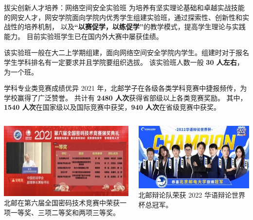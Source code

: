 \documentclass[aspectratio=169, utf8]{beamer}
\begin{document}
\begin{frame}{拔尖创新人才培养：网络空间安全实验班}
    为培养有坚实理论基础和卓越实战技能的网安人才，网安学院面向学院内优秀学生组建实验班，通过探索性、创新性和实战性的培养机制，
    以及\textcolor{Fore}{\textbf{“以赛促学，以练促学”}}的教学模式，提高学生理论与实践能力。
    目前实验班学生已在国内外大赛中屡获佳绩。

    该实验班一般在大二上学期组建，面向网络空间安全学院内学生。组建时对于报名学生学科排名有一定要求并且学院要组织选拔。
    该实验班人数一般 \textcolor{Fore}{\textbf{30 人左右}}，为一个班。
\end{frame}

\begin{frame}{学科专业类竞赛成绩优异}
    2021 年，北邮学子在各级各类学科竞赛中捷报频传，为学校赢得了广泛赞誉。
    共计有 \textcolor{Fore}{\textbf{2480 人次}}获得省部级以上各类竞赛奖励。
    其中，\textcolor{Fore}{\textbf{1540 人次}}在国家级以及国际竞赛中获奖，\textcolor{Fore}{\textbf{940 人次}}在省级竞赛中获奖。\\[1em]

    \begin{columns}
        \scriptsize
        \includegraphics[width=\textwidth]{./resources/12.jpg}\\[0em]

        北邮在第六届全国密码技术竞赛中荣获一项一等奖、三项二等奖和两项三等奖。

        \scriptsize
        \includegraphics[width=\textwidth]{./resources/13.jpg}\\[0em]

        北邮辩论队荣获 2022 华语辩论世界杯总冠军。
    \end{columns}
\end{frame}
\end{document}
